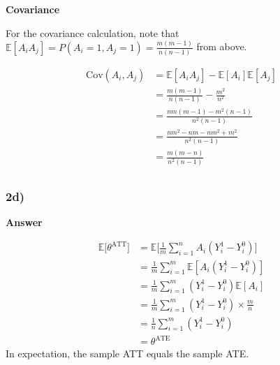 \documentclass[
  11pt,
  letterpaper,
  DIV=11,
  numbers=noendperiod]{scrartcl}
\newcommand{\cov}{\text{Cov}}
\begin{document}
\begin{tcolorbox}[enhanced jigsaw, arc=.35mm, colback=white, bottomrule=.15mm, breakable, opacityback=0, rightrule=.15mm, toprule=.15mm, leftrule=.75mm, left=2mm, colframe=quarto-callout-note-color-frame]

\textbf{Covariance}\vspace{2mm}

For the covariance calculation, note that
\(\mathbb{E}[A_iA_j] = P(A_i = 1, A_j = 1) = \frac{m(m-1)}{n(n-1)}\)
from above.

\[
\begin{aligned}
\cov(A_i, A_j) &= \mathbb{E}[A_iA_j] - \mathbb{E}[A_i]\mathbb{E}[A_j] \\ 
&= \frac{m(m-1)}{n(n-1)} - \frac{m^2}{n^2} \\ 
&= \frac{nm(m-1) - m^2(n-1)}{n^2(n-1)} \\ 
&= \frac{nm^2 - nm - nm^2 + m^2}{n^2(n-1)} \\
&= \frac{m(m-n)}{n^2(n-1)} \\
\end{aligned}
\]

\end{tcolorbox}

\hypertarget{d}{%
\subsubsection{2d)}\label{d}}

\begin{tcolorbox}[enhanced jigsaw, arc=.35mm, colback=white, bottomrule=.15mm, breakable, opacityback=0, rightrule=.15mm, toprule=.15mm, leftrule=.75mm, left=2mm, colframe=quarto-callout-note-color-frame]

\textbf{Answer}\vspace{2mm}

\[
\begin{aligned}
\mathbb{E}\bigr[\theta^\text{ATT}\bigr] &= \mathbb{E}\biggr[\frac{1}{m}\sum_{i = 1}^n A_i(Y_i^1 - Y_i^0)\biggr] \\
&= \frac{1}{m}\sum_{i = 1}^m \mathbb{E}[A_i(Y_i^1 - Y_i^0)] \\
&= \frac{1}{m}\sum_{i = 1}^m (Y_i^1 - Y_i^0)\mathbb{E}[A_i] \\
&= \frac{1}{m}\sum_{i = 1}^m (Y_i^1 - Y_i^0)\times\frac{m}{n} \\
&= \frac{1}{n}\sum_{i = 1}^m (Y_i^1 - Y_i^0) \\
&= \theta^\text{ATE}
\end{aligned}
\] In expectation, the sample ATT equals the sample ATE.

\end{tcolorbox}
\end{document}
